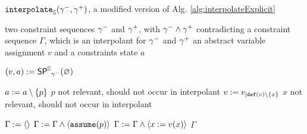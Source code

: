 \begin{algorithm}[t]
\caption{$\texttt{interpolate}_{\mathbb{S}}({\gamma^{-}}, {\gamma^{+}})$, a modified version of Alg. \ref{alg:interpolateExplicit}}
\label{alg:interpolateSym}
\begin{algorithmic}[1]
\Input two constraint sequences ${\gamma^{-}}$ and ${\gamma^{+}}$, with ${\gamma^{-}} \wedge {\gamma^{+}}$ contradicting
\Output a constraint sequence $\Gamma$, which is an interpolant for ${\gamma^{-}}$ and ${\gamma^{+}}$
\Variables an abstract variable assignment $v$ and a constraints state $a$

\State $(v, a) := \operatorname{\operatorname{\operatorname{\mathsf{SP}}}^{\mathbb{S}}}_{\gamma^{-}}(\varnothing)$

 \label{alg:interpolateSym:aInterpolationBegin}
		\State $a := a \setminus \{ p \}$ \Comment $p$ not relevant, should not occur in interpolant
	\EndIf
\EndFor \label{alg:interpolateSym:aInterpolationEnd}
 \label{alg:interpolateSym:vInterpolationBegin}
		\State $v := v_{|\texttt{def}(v) \setminus \{x\}}$ \Comment $x$ not relevant, should not occur in interpolant
	\EndIf
\EndFor\label{alg:interpolateSym:vInterpolationEnd}

\State $\Gamma := \langle \rangle$
 \label{alg:interpolateSym:itpAStart}
	\State $\Gamma := \Gamma \wedge \langle \texttt{assume}(p) \rangle$
\EndFor \label{alg:interpolateSym:itpAEnd}
 \label{alg:interpolateSym:itpVStart}
	\State $\Gamma := \Gamma \wedge \langle x := v(x)\rangle$ \label{alg:interpolateSym:vBuildInterpolant}
\EndFor \label{alg:interpolateSym:itpVEnd}
\State %
\Return $\Gamma$
\end{algorithmic}
\end{algorithm}

